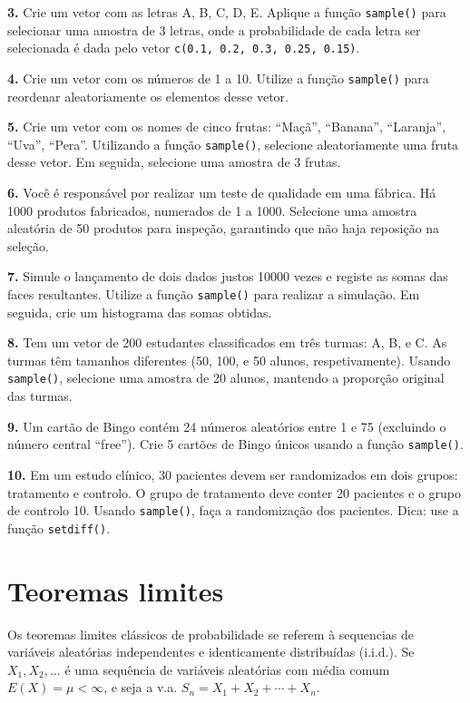 \documentclass[
]{book}
\begin{document}
\textbf{3.} Crie um vetor com as letras A, B, C, D, E. Aplique a função
\texttt{sample()} para selecionar uma amostra de 3 letras, onde a probabilidade
de cada letra ser selecionada é dada pelo vetor
\texttt{c(0.1,\ 0.2,\ 0.3,\ 0.25,\ 0.15)}.

\textbf{4.} Crie um vetor com os números de 1 a 10. Utilize a função
\texttt{sample()} para reordenar aleatoriamente os elementos desse vetor.

\textbf{5.} Crie um vetor com os nomes de cinco frutas: ``Maçã'', ``Banana'',
``Laranja'', ``Uva'', ``Pera''. Utilizando a função \texttt{sample()}, selecione
aleatoriamente uma fruta desse vetor. Em seguida, selecione uma amostra
de 3 frutas.

\textbf{6.} Você é responsável por realizar um teste de qualidade em uma
fábrica. Há 1000 produtos fabricados, numerados de 1 a 1000. Selecione
uma amostra aleatória de 50 produtos para inspeção, garantindo que não
haja reposição na seleção.

\textbf{7.} Simule o lançamento de dois dados justos 10000 vezes e registe as
somas das faces resultantes. Utilize a função \texttt{sample()} para realizar a
simulação. Em seguida, crie um histograma das somas obtidas.

\textbf{8.} Tem um vetor de 200 estudantes classificados em três turmas: A,
B, e C. As turmas têm tamanhos diferentes (50, 100, e 50 alunos,
respetivamente). Usando \texttt{sample()}, selecione uma amostra de 20 alunos,
mantendo a proporção original das turmas.

\textbf{9.} Um cartão de Bingo contém 24 números aleatórios entre 1 e 75
(excluindo o número central ``free''). Crie 5 cartões de Bingo únicos
usando a função \texttt{sample()}.

\textbf{10.} Em um estudo clínico, 30 pacientes devem ser randomizados em
dois grupos: tratamento e controlo. O grupo de tratamento deve conter 20
pacientes e o grupo de controlo 10. Usando \texttt{sample()}, faça a
randomização dos pacientes. Dica: use a função \texttt{setdiff()}.

\chapter{Teoremas limites}\label{teoremas-limites}

Os teoremas limites clássicos de probabilidade se referem à sequencias de variáveis aleatórias independentes e identicamente distribuídas (i.i.d.). Se \(X_1,X_2,\ldots\) é uma sequência de variáveis aleatórias com média comum \(E(X)=\mu < \infty\), e seja a v.a. \(S_n = X_1 + X_2 + \cdots + X_n\).
\end{document}
